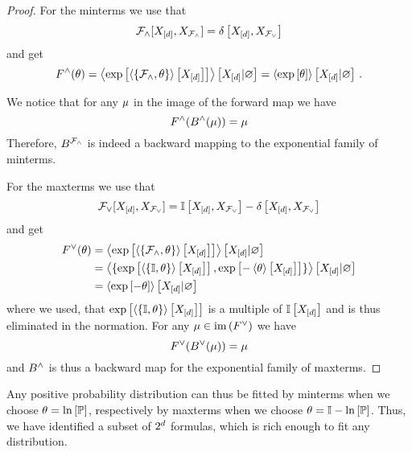 \begin{proof}
	For the minterms we use that
		\[ \mathcal{F}_{\land}[X_{[d]},X_{\mathcal{F}_{\land}}]  = \delta\left[X_{[d]},X_{\mathcal{F}_{\lor}}\right]\] 
	and get
		\[ F^{\land}(\theta) 
		= \left\langle 
		\mathrm{exp}\left[\left\langle \{\mathcal{F}_{\land}, \theta\}\right\rangle \left[ X_{[d]} \right]\right]
		\right\rangle \left[ X_{[d]} | \varnothing \right]
		= 
		\left\langle \mathrm{exp}\left[\theta\right]\right\rangle \left[ X_{[d]} | \varnothing \right] \, . 
		\]
	
	We notice that for any $\mu$ in the image of the forward map we have
		\[ F^{\land}(B^{\land}(\mu)) = \mu \]
	Therefore, $B^{\mathcal{F}_{\land}}$ is indeed a backward mapping to the exponential family of minterms.
	
	For the maxterms we use that
		\[ \mathcal{F}_{\lor}[X_{[d]},X_{\mathcal{F}_{\lor}}] = \mathbb{I}\left[X_{[d]},X_{\mathcal{F}_{\lor}}\right]-\delta\left[X_{[d]},X_{\mathcal{F}_{\lor}}\right] \]
	and get
	\begin{align*}
		F^{\lor}(\theta) 
		& = \left\langle 
		\mathrm{exp}\left[\left\langle \{\mathcal{F}_{\land}, \theta\}\right\rangle \left[ X_{[d]} \right]\right]
		\right\rangle \left[ X_{[d]} | \varnothing \right] \\
		& = \left\langle \{
		\mathrm{exp}\left[\left\langle \{\mathbb{I}, \theta\}\right\rangle \left[ X_{[d]} \right]\right], 
		\mathrm{exp}\left[-\left\langle \theta\right\rangle \left[ X_{[d]} \right]\right] \}
		\right\rangle \left[ X_{[d]} | \varnothing \right] \\
		& = \left\langle 
		\mathrm{exp}\left[-\theta\right]
		\right\rangle \left[ X_{[d]} | \varnothing \right]
	\end{align*}
	where we used, that $\mathrm{exp}\left[\left\langle \{\mathbb{I}, \theta\}\right\rangle \left[ X_{[d]} \right]\right]$ is a multiple of $\mathbb{I}\left[X_{[d]}\right]$ and is thus eliminated in the normation.
	For any $\mu\in\mathrm{im}\left(F^{\lor}\right)$ we have
		\[ F^{\lor}(B^{\lor}(\mu) ) 
		= \mu
		\]
	and $B^{\land}$ is thus a backward map for the exponential family of maxterms.
\end{proof}

Any positive probability distribution can thus be fitted by minterms when we choose $\theta=\ln \left[ \mathbb{P} \right]$, respectively by maxterms when we choose $\theta=\mathbb{I}-\ln \left[ \mathbb{P} \right]$.
Thus, we have identified a subset of $2^{d}$ formulas, which is rich enough to fit any distribution.





